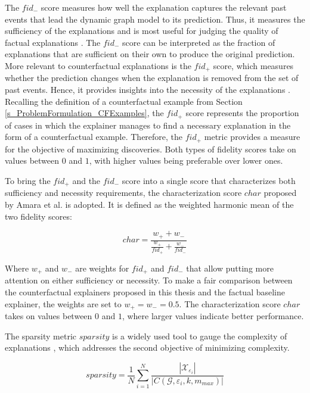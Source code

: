 The $fid_-$ score measures how well the explanation captures the relevant past events that lead the dynamic graph model to its prediction. Thus, it measures the sufficiency of the explanations and is most useful for judging the quality of factual explanations \cite{amara_graphframex_2022}. The $fid_-$ score can be interpreted as the fraction of explanations that are sufficient on their own to produce the original prediction. More relevant to counterfactual explanations is the $fid_+$ score, which measures whether the prediction changes when the explanation is removed from the set of past events. Hence, it provides insights into the necessity of the explanations \cite{amara_graphframex_2022, tan_learning_2022}. Recalling the definition of a counterfactual example from Section \ref{s_ProblemFormulation_CFExamples}, the $fid_+$ score represents the proportion of cases in which the explainer manages to find a necessary explanation in the form of a counterfactual example. Therefore, the $fid_+$ metric provides a measure for the objective of maximizing discoveries. Both types of fidelity scores take on values between $0$ and $1$, with higher values being preferable over lower ones.

To bring the $fid_+$ and the $fid_-$ score into a single score that characterizes both sufficiency and necessity requirements, the characterization score $char$ proposed by Amara et al. \cite{amara_graphframex_2022} is adopted. It is defined as the weighted harmonic mean of the two fidelity scores:

\begin{equation}
    char = \frac{w_+ + w_-}{\frac{w_+}{fid_+} + \frac{w_-}{fid_-}}
\end{equation}

Where $w_+$ and $w_-$ are weights for $fid_+$ and $fid_-$ that allow putting more attention on either sufficiency or necessity. To make a fair comparison between the counterfactual explainers proposed in this thesis and the factual baseline explainer, the weights are set to $w_+ = w_- = 0.5$. The characterization score $char$ takes on values between $0$ and $1$, where larger values indicate better performance.

The sparsity metric $sparsity$ is a widely used tool to gauge the complexity of explanations \cite{yuan_explainability_2020, amara_graphframex_2022, prado-romero_survey_2023}, which addresses the second objective of minimizing complexity.

\begin{equation}
    sparsity = \frac{1}{N} \sum_{i = 1}^N \frac{|\mathcal{X}_{\varepsilon_i}|}{|C(\mathcal{G}, \varepsilon_i, k, m_{max})|}
\end{equation}

